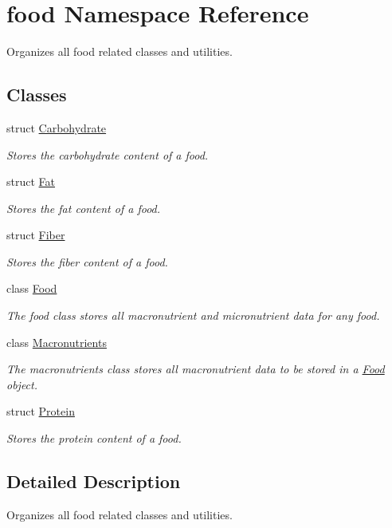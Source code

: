 \hypertarget{namespacefood}{}\section{food Namespace Reference}
\label{namespacefood}


Organizes all food related classes and utilities.  


\subsection*{Classes}
\begin{DoxyCompactItemize}
\item 
struct \hyperlink{structfood_1_1_carbohydrate}{Carbohydrate}
\begin{DoxyCompactList}\small\item\em Stores the carbohydrate content of a food. \end{DoxyCompactList}\item 
struct \hyperlink{structfood_1_1_fat}{Fat}
\begin{DoxyCompactList}\small\item\em Stores the fat content of a food. \end{DoxyCompactList}\item 
struct \hyperlink{structfood_1_1_fiber}{Fiber}
\begin{DoxyCompactList}\small\item\em Stores the fiber content of a food. \end{DoxyCompactList}\item 
class \hyperlink{classfood_1_1_food}{Food}
\begin{DoxyCompactList}\small\item\em The food class stores all macronutrient and micronutrient data for any food. \end{DoxyCompactList}\item 
class \hyperlink{classfood_1_1_macronutrients}{Macronutrients}
\begin{DoxyCompactList}\small\item\em The macronutrients class stores all macronutrient data to be stored in a \hyperlink{classfood_1_1_food}{Food} object. \end{DoxyCompactList}\item 
struct \hyperlink{structfood_1_1_protein}{Protein}
\begin{DoxyCompactList}\small\item\em Stores the protein content of a food. \end{DoxyCompactList}\end{DoxyCompactItemize}


\subsection{Detailed Description}
Organizes all food related classes and utilities. 